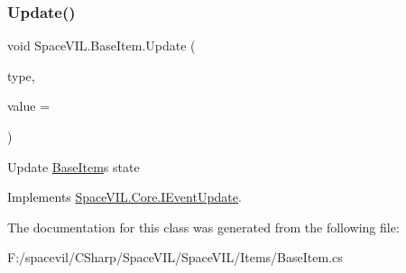 \subsubsection{\texorpdfstring{Update()}{Update()}}
{\footnotesize\ttfamily void Space\+V\+I\+L.\+Base\+Item.\+Update (\begin{DoxyParamCaption}\item[{Geometry\+Event\+Type}]{type,  }\item[{int}]{value = {} }\end{DoxyParamCaption})\hspace{0.3cm}{\ttfamily [inline]}}



Update \mbox{\hyperlink{class_space_v_i_l_1_1_base_item}{Base\+Item}}\textquotesingle{}s state 



Implements \mbox{\hyperlink{interface_space_v_i_l_1_1_core_1_1_i_event_update}{Space\+V\+I\+L.\+Core.\+I\+Event\+Update}}.



The documentation for this class was generated from the following file\+:\begin{DoxyCompactItemize}
\item 
F\+:/spacevil/\+C\+Sharp/\+Space\+V\+I\+L/\+Space\+V\+I\+L/\+Items/Base\+Item.\+cs\end{DoxyCompactItemize}
